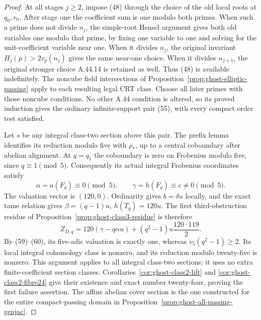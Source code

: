 \begin{proof}
At all stages \(j\ge2\), impose (48) through
the choice of the old local roots at \(q_0,r_0\).
After stage one the coefficient sum is one modulo
both primes. When such a prime does not divide
\(n_j\), the simple-root Hensel argument gives
both old variables one modulo that prime, by
fixing one variable to one and solving for the
unit-coefficient variable near one. When it divides
\(n_j\), the original invariant
\(H_j(p)>2v_p(n_j)\) gives the same near-one
choice. When it divides \(n_{j+1}\), the original
stronger choice A.44.14 is retained as well.
Thus (48) is available indefinitely. The noncube
field intersections of
Proposition~\ref{prop:ghost-elliptic-passing}
apply to each resulting legal CRT class. Choose
all later primes with those noncube conditions.
No other A.44 condition is altered, so its proved
induction gives the ordinary infinite-support pair
(55), with every compact order test satisfied.

Let \(s\) be any integral class-two section above
this pair. The prefix lemma identifies its reduction
modulo five with \(\rho_*\), up to a central
coboundary after abelian alignment. At
\(q=q_1\) the coboundary is zero on Frobenius
modulo five, since \(q\equiv1\pmod5\).
Consequently its actual integral Frobenius
coordinates satisfy
\[
 \alpha=a(F_q)\equiv0\pmod5,\qquad
 \gamma=h(F_q)\equiv c\ne0\pmod5.                    \tag{60}
\]
The valuation vector is \((120,0)\).
Ordinarity gives \(b=\delta u\) locally, and
the exact tame relation gives
\(\beta=(q-1)u\), \(h(T_q)=120u\).
The first third-obstruction residue of
Proposition~\ref{prop:ghost-class3-residue} is therefore
\[
 Z_{D,q}=120(\gamma-q\alpha u)
          +(q^2-1)u\frac{120\cdot119}{2}.             \tag{61}
\]
By (59)--(60), its five-adic valuation is exactly
one, whereas \(v_5(q^2-1)\ge2\). Its local
integral cohomology class is nonzero, and its
reduction modulo twenty-five is nonzero. This
argument applies to all integral class-two sections;
it uses no extra finite-coefficient section classes.
Corollaries~\ref{cor:ghost-class2-lift} and
\ref{cor:ghost-class2-fibre24} give their existence
and exact number twenty-four, proving the first
failure assertion. The affine abelian cover section
is the one constructed for the entire compact-passing
domain in Proposition~\ref{prop:ghost-all-passing-genjac}.
\end{proof}

